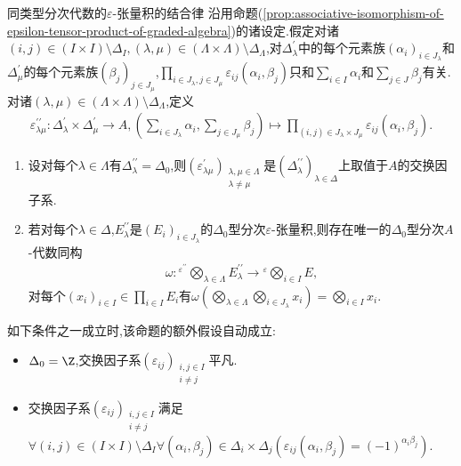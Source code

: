 \begin{proposition}{同类型分次代数的$\varepsilon$-张量积的结合律}{}
	沿用命题(\cref{prop:associative-isomorphism-of-epsilon-tensor-product-of-graded-algebra})的诸设定.假定对诸$\left(i,j\right)\in\left(I\times I\right)\setminus\Delta_{I},\left(\lambda,\mu\right)\in\left(\Lambda\times\Lambda\right)\setminus\Delta_{\Lambda}$,对$\Delta_{\lambda}^{\prime}$中的每个元素族$\left(\alpha_{i}\right)_{i\in J_{\lambda}}$和$\Delta_{\mu}^{\prime}$的每个元素族$\left(\beta_{j}\right)_{j\in J_{\mu}}$,$\prod\limits_{i\in J_{\lambda},j\in J_{\mu}}\varepsilon_{ij}\left(\alpha_{i},\beta_{j}\right)$只和$\sum\limits_{i\in I}\alpha_{i}$和$\sum\limits_{j\in J}\beta_{j}$有关.对诸$\left(\lambda,\mu\right)\in\left(\Lambda\times\Lambda\right)\setminus\Delta_{\Lambda}$,定义
	\begin{align*}
		\varepsilon_{\lambda\mu}^{\prime\prime}:\Delta_{\lambda}^{\prime}\times\Delta_{\mu}^{\prime}\to A,\left(\sum\limits_{i\in J_{\lambda}}\alpha_{i},\sum\limits_{j\in J_{\mu}}\beta_{j}\right)\mapsto\prod\limits_{\left(i,j\right)\in J_{\lambda}\times J_{\mu}}\varepsilon_{ij}\left(\alpha_{i},\beta_{j}\right).
	\end{align*}
	\begin{enumerate}
		\item 设对每个$\lambda\in\Lambda$有$\Delta_{\lambda}^{\prime\prime}=\Delta_{0}$,则$\left(\varepsilon_{\lambda\mu}^{\prime}\right)_{\substack{\lambda,\mu\in \Lambda\\ \lambda\neq\mu}}$是$\left(\Delta_{\lambda}^{\prime\prime}\right)_{\lambda\in\Delta}$上取值于$A$的交换因子系.
		\item 若对每个$\lambda\in\Delta$,$E_{\lambda}^{\prime\prime}$是$\left(E_{i}\right)_{i\in J_{\lambda}}$的$\Delta_{0}$型分次$\varepsilon$-张量积,则存在唯一的$\Delta_{0}$型分次$A$-代数同构
		\begin{align*}
			\omega:{}^{\varepsilon^{\prime\prime}}\bigotimes\limits_{\lambda\in\Lambda}E_{\lambda}^{\prime\prime}\to{}^{\varepsilon}\bigotimes\limits_{i\in I}E,
		\end{align*}
		对每个$\left(x_{i}\right)_{i\in I}\in\prod\limits_{i\in I}E_{i}$有$\omega\left(\bigotimes\limits_{\lambda\in\Lambda}\bigotimes\limits_{i\in J_{\lambda}}x_{i}\right)=\bigotimes\limits_{i\in I}x_{i}$.
	\end{enumerate}
\end{proposition}

\begin{remark}{}{}
	如下条件之一成立时,该命题的额外假设自动成立:
	\begin{itemize}
		\item $\Delta_{0}=\Z$,交换因子系$\left(\varepsilon_{ij}\right)_{\substack{i,j\in I\\i\neq j}}$平凡.
		\item 交换因子系$\left(\varepsilon_{ij}\right)_{\substack{i,j\in I\\i\neq j}}$满足$\forall\left(i,j\right)\in\left(I\times I\right)\setminus\Delta_{I}\forall\left(\alpha_{i},\beta_{j}\right)\in\Delta_{i}\times\Delta_{j}\left(\varepsilon_{ij}\left(\alpha_{i},\beta_{j}\right)=\left(-1\right)^{\alpha_{i}\beta_{j}}\right)$.
	\end{itemize}
\end{remark}


